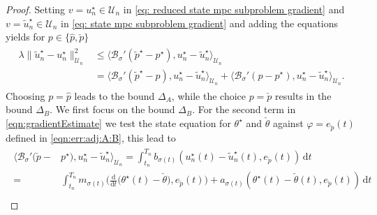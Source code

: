 \documentclass[reqno]{amsart}
\newcommand{\U}{{\mathscr U}}
\newcommand{\state}{\theta}
\newcommand{\adState}{p}
\newcommand{\inpVar}{u}
\newcommand{\dt}{\,\mathrm{d}t}
\newcommand{\ddt}{\tfrac{\mathrm{d}}{\mathrm{d}t}}
\newcommand{\bOper}{\calB}
\newcommand{\optState}{\state^\star}
\newcommand{\optAdState}{\adState^\star}
\newcommand{\optInpVar}[1]{\inpVar_{#1}^\star}
\newcommand{\optInpVarN}{\optInpVar{n}}
\newcommand{\switch}{\sigma}
\newcommand{\reduce}[1]{\tilde{#1}}
\newcommand{\BoundControlA}{\Delta_{A}}
\newcommand{\BoundControlB}{\Delta_{B}}
\newcommand{\adStateRed}{\reduce{\adState}}
\newcommand{\optAdStateRed}{\adStateRed^\star}
\newcommand{\optInpVarRed}[1]{\reduce{\inpVar}_{#1}^\star}
\newcommand{\optInpVarRedN}{\optInpVarRed{n}}
\newcommand{\intermediateState}{\check{\state}}
\newcommand{\intermediateAdStateA}{{\hat \adState}}
\newcommand{\intermediateAdStateB}{\check{\adState}}
\newcommand{\calB}{\mathcal{B}}
\begin{document}
\begin{proof}
	Setting $v = \optInpVarN\in\U_n$ in \eqref{eq: reduced state mpc subproblem gradient} and $v = \optInpVarRedN\in\U_n$ in \eqref{eq: state mpc subproblem gradient} and adding the equations yields for $p\in \{\intermediateAdStateA, \intermediateAdStateB \}$
	\begin{align}
		\label{eqn:gradientEstimate}
		\begin{aligned}
		\lambda \|\optInpVarRedN - \optInpVarN\|^2_{\U_n} &\leq \langle \bOper_{\switch}'(\optAdStateRed-\optAdState), \optInpVarN-\optInpVarRedN \rangle_{\U_n}\\
		&= \langle \bOper_{\switch}'(\optAdStateRed-p), \optInpVarN-\optInpVarRedN \rangle_{\U_n} + \langle \bOper_{\switch}'(p-\optAdState), \optInpVarN-\optInpVarRedN \rangle_{\U_n}.
		\end{aligned}
	\end{align}
    Choosing $p=\intermediateAdStateA$ leads to the bound $\BoundControlA$, while the choice $p=\intermediateAdStateB$ results in the bound $\BoundControlB$.
    We first focus on the bound {$\BoundControlB$}.
	For the second term in \eqref{eqn:gradientEstimate} we test the state equation for $\optState$ and $\intermediateState$ against 
 $\varphi = e_{\intermediateAdStateB}(t)$ defined in \eqref{eqn:err:adj:A:B}, this lead to
	\begin{align}\label{eqn:controlBoundPorrf:DualityArgument}
 \begin{aligned}
		\langle \bOper_{\switch}'(\intermediateAdStateB-&\optAdState), \optInpVarN-\optInpVarRedN \rangle_{\U_n}= \int_{t_n}^{T_n} b_{\switch(t)}(\optInpVarN(t) - \optInpVarRedN(t),e_{\intermediateAdStateB}(t)) \dt\\
    =& \int_{t_n}^{T_n} m_{\switch(t)}\big(\ddt \big(\optState(t) - \intermediateState \big), e_{\intermediateAdStateB}(t)\big) + a_{\switch(t)}(\optState(t) - \intermediateState(t), e_{\intermediateAdStateB}(t)) \dt\\

\end{aligned}
\end{align}
\end{proof}
\end{document}

